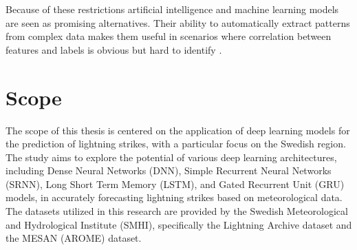 Because of these restrictions artificial intelligence and machine learning models are seen as promising alternatives. Their ability to automatically extract patterns from complex data makes them useful in scenarios where correlation between features and labels is obvious but hard to identify \cite{bib8}.



\section{Scope}

The scope of this thesis is centered on the application of deep learning models for the prediction of lightning strikes, with a particular focus on the Swedish region. The study aims to explore the potential of various deep learning architectures, including Dense Neural Networks (DNN), Simple Recurrent Neural Networks (SRNN), Long Short Term Memory (LSTM), and Gated Recurrent Unit (GRU) models, in accurately forecasting lightning strikes based on meteorological data. The datasets utilized in this research are provided by the Swedish Meteorological and Hydrological Institute (SMHI), specifically the Lightning Archive dataset and the MESAN (AROME) dataset.


